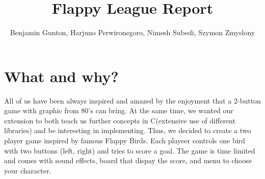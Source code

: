 \documentclass[11pt]{article}
\begin{document}
\title{Flappy League Report}
\author{Benjamin Gunton, Harjuno Perwironegoro, Nimesh Subedi, Szymon Zmyslony}

\maketitle

\section{What and why?}
All of us have been always inspired and amazed by the enjoyment that a 2-button game with graphic from 80's can bring. At the same time, we wanted our extension to both teach us further concepts in C(extensive use of different libraries) and be interesting in implementing. Thus, we decided to create a two player game inspired by famous Flappy Birds. Each playeer controls one bird with two buttons (left, right) and tries to score a goal. The game is time limited and comes with sound effects, board that dispay the score, and menu to choose your character.
\end{document}
